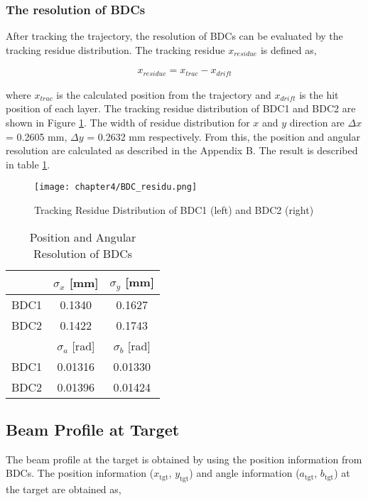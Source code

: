 \subsubsection{The resolution of BDCs}
After tracking the trajectory, the resolution of BDCs can be evaluated by the tracking residue distribution. The tracking residue $x_{residue}$ is defined as,

\begin{align}
    x_{residue} = x_{trac} - x_{drift}
\end{align}

where $x_{trac}$ is the calculated position from the trajectory and $x_{drift}$ is the hit position of each layer. The tracking residue distribution of BDC1 and BDC2 are shown in Figure \ref{fig:residue_bdcs}. The width of residue distribution for $x$ and $y$ direction are $\Delta x$ = 0.2605 mm, $\Delta y$ = 0.2632 mm respectively. From this, the position and angular resolution are calculated as described in the Appendix B. The result is described in table \ref{tab:resolution_bdcs}.
 \begin{figure}
    \centering
    \texttt{[image: chapter4/BDC\_residu.png]}
    \caption[Tracking Residue Distribution of BDCs]{Tracking Residue Distribution of BDC1 (left) and BDC2 (right)}
    \label{fig:residue_bdcs}
\end{figure}

\begin{table}[b]
    \centering
    \begin{tabular}{c|cc}
    \hline
     & $\sigma_x$ [mm] & $\sigma_y$ [mm]\\
    \hline
    BDC1 & 0.1340 & 0.1627 \\
    BDC2 & 0.1422 & 0.1743 \\
    \hline 
    \hline
    & $\sigma_a$ [rad] & $\sigma_b$ [rad]\\
    \hline
    BDC1 & 0.01316 & 0.01330 \\
    BDC2 & 0.01396 & 0.01424 \\
    \hline
    \end{tabular}
    \caption{Position and Angular Resolution of BDCs}
    \label{tab:resolution_bdcs}
\end{table}

\subsection{Beam Profile at Target}
The beam profile at the target is obtained by using the position information from BDCs. The position information ($x_{\text{tgt}}$, $y_{\text{tgt}}$) and angle information ($a_{\text{tgt}}$, $b_{\text{tgt}}$) at the target are obtained as,


